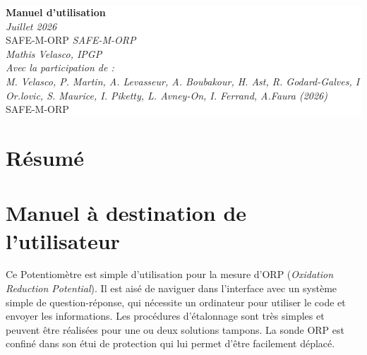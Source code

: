 \documentclass[twoside]{ipgplicence}
\begin{document}

\pagecolor{ipgpred}   %
\color{white}         

\vspace*{6cm}

\begin{center}
\colorbox{white}{%
  \parbox{\textwidth}{%
    \centering
    \color{ipgpred}
    \vspace{1.5cm}
    {\Huge\bfseries Manuel d'utilisation}\\[0.5em]
    \vspace{1cm}
    {\large\itshape Juillet 2026}\\[1em]
     {\LARGE SAFE-M-ORP}
    {\large\itshape SAFE-M-ORP}\\[1em]
    {\large\itshape Mathis Velasco, IPGP}\\[1em]
    {\large\itshape \textit{Avec la participation de :}\\
M. Velasco, P. Martin, A. Levasseur, A. Boubakour, H. Ast, R. Godard-Galves,
 I Or.lovic, S. Maurice, I. Piketty, L. Avney-On, 
 I. Ferrand, A.Faura (2026) }\\[1em]
    {\LARGE SAFE-M-ORP}
    \vspace{1.5cm}
  }%
}%
\end{center}



\newpage

\pagestyle{fancy}



\section*{Résumé}

\pagecolor{white}\color{black}
\section*{Manuel à destination de l’utilisateur}

Ce Potentiomètre est simple d’utilisation pour la mesure d'ORP (\textit{Oxidation Reduction Potential}). Il est aisé de naviguer dans l’interface avec
un système simple de question-réponse, qui nécessite un ordinateur pour utiliser le code et envoyer
les informations. Les procédures d’étalonnage sont très simples et peuvent être réalisées pour une ou
deux solutions tampons.
La sonde ORP est confiné dans son étui de protection qui lui permet d’être facilement déplacé.\\
\end{document}
